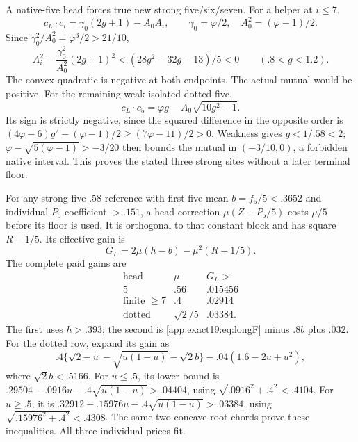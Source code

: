 A native-five head forces true
new strong five/six/seven.
For a helper at \(i\le7\),
\[
 c_L\cdot c_i=\gamma_0(2g+1)-A_0A_i,\qquad
       \gamma_0=\varphi/2,\quad A_0^2=(\varphi-1)/2 .
\]
Since \(\gamma_0^2/A_0^2=\varphi^3/2>21/10\),
\[
 A_i^2-\frac{\gamma_0^2}{A_0^2}(2g+1)^2
                   <(28g^2-32g-13)/5<0
                  \qquad(.8<g<1.2).
\]
The convex quadratic is negative
at both endpoints.
The actual mutual would be
positive.
For the remaining weak isolated
dotted five,
\[
 c_L\cdot c_5=\varphi g-A_0\sqrt{10g^2-1}.
\]
Its sign is strictly negative,
since the squared difference in
the opposite order is
\((4\varphi-6)g^2-(\varphi-1)/2
\ge(7\varphi-11)/2>0\).
Weakness gives \(g<1/.58<2\);
\(\varphi-\sqrt{5(\varphi-1)}>-3/20\)
then bounds the mutual in
\((-3/10,0)\), a forbidden native
interval.
This proves the stated three
strong sites without a later
terminal floor.

For any strong-five \(.58\)
reference with first-five mean
\(b=f_5/5<.3652\) and individual
\(P_5\) coefficient \(>.151\),
a head correction
\(\mu(Z-P_5/5)\) costs \(\mu/5\)
before its floor is used.
It is orthogonal to that constant
block and has square \(R-1/5\).
Its effective gain is
\[
                             G_L=2\mu(h-b)-\mu^2(R-1/5).
\]
The complete paid gains are
\[
\begin{array}{c|c|c}
 \text{head}&\mu&G_L>\\ \hline
 5&.56&.015456\\
 \text{finite }\ge7&.4&.02914\\
 \text{dotted}&\sqrt2/5&.03384 .
\end{array}
\tag{B19headgains}\label{app:exact19:eq:Bheadgains}
\]
The first uses \(h>.393\);
the second is
\eqref{app:exact19:eq:longF}
minus \(.8b\) plus \(.032\).
For the dotted row, expand its
gain as
\[
 .4\{\sqrt{2-u}-\sqrt{u(1-u)}-\sqrt2b\}
                                -.04(1.6-2u+u^2),
\]
where \(\sqrt2b<.5166\).
For \(u\le.5\), its lower bound is
\(.29504-.0916u-.4\sqrt{u(1-u)}>.04404\),
using \(\sqrt{.0916^2+.4^2}<.4104\).
For \(u\ge.5\), it is
\(.32912-.15976u-.4\sqrt{u(1-u)}>.03384\),
using \(\sqrt{.15976^2+.4^2}<.4308\).
The same two concave root chords
prove these inequalities.
All three individual prices fit.

